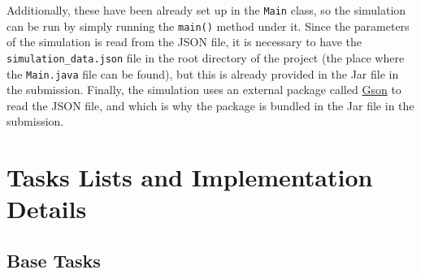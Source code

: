 \documentclass[10pt, a4paper]{scrartcl}
\begin{document}
\begin{multicols}{2}
        \noindent Additionally, these have been already set up in the \verb|Main| class, so the simulation can be run by simply running
        the \verb|main()| method under it. Since the parameters of the simulation is read from the JSON file, it is necessary
        to have the \verb|simulation_data.json| file in the root directory of the project (the place where the \verb|Main.java|
        file can be found), but this is already provided in the Jar file in the submission. Finally, the simulation uses an
        external package called \href{https://github.com/google/gson/}{Gson} to read the
        JSON file, and which is why the package is bundled in the Jar file in the submission.

        \section{Tasks Lists and Implementation Details}

        \subsection{Base Tasks}


\end{multicols}
\end{document}
